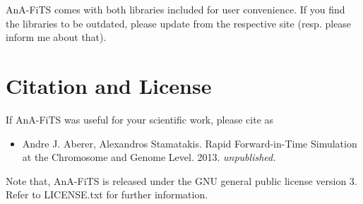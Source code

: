 \documentclass{scrartcl}
\begin{document}
AnA-FiTS comes with both libraries included for user convenience. If
you find the libraries to be outdated, please update from the
respective site (resp. please inform me about that).

\section{Citation and License }
\label{sec:citation}

If AnA-FiTS was useful for your scientific work, please cite as 

\begin{itemize}
\item Andre J. Aberer, Alexandros Stamatakis. Rapid Forward-in-Time Simulation at the Chromosome and Genome Level. 2013. \textit{unpublished.}
\end{itemize}


\noindent Note that, AnA-FiTS is released under the GNU general public
license version 3. Refer to LICENSE.txt for further information. 
\end{document}
